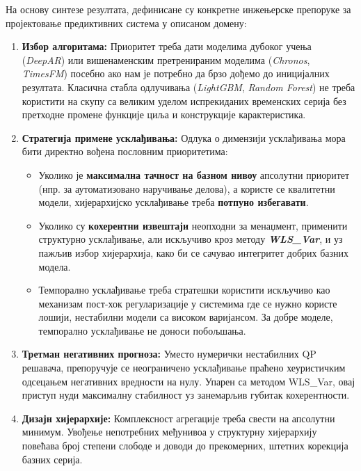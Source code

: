 \documentclass[12pt,oneside]{memoir}
\begin{document}
На основу синтезе резултата, дефинисане су конкретне инжењерске препоруке за пројектовање предиктивних система у описаном домену:

\begin{enumerate}
    \item \textbf{Избор алгоритама:} Приоритет треба дати моделима дубоког учења (\textit{DeepAR}) или вишенаменским претренираним моделима (\textit{Chronos}, \textit{TimesFM}) посебно ако нам је потребно да брзо дођемо до иницијалних резултата. Класична стабла одлучивања (\textit{LightGBM}, \textit{Random Forest}) не треба користити на скупу са великим уделом испрекиданих временских серија без претходне промене функције циља и конструкције карактеристика.
    
    \item \textbf{Стратегија примене усклађивања:} Одлука о димензији усклађивања мора бити директно вођена пословним приоритетима:
    \begin{itemize}
        \item Уколико је \textbf{максимална тачност на базном нивоу} апсолутни приоритет (нпр. за аутоматизовано наручивање делова), а користе се квалитетни модели, хијерархијско усклађивање треба \textbf{потпуно избегавати}.
        \item Уколико су \textbf{кохерентни извештаји} неопходни за менаџмент, применити структурно усклађивање, али искључиво кроз методу \textbf{\textit{WLS\_Var}}, и уз пажљив избор хијерархија, како би се сачувао интегритет добрих базних модела.
        \item Темпорално усклађивање треба стратешки користити искључиво као механизам пост-хок регуларизације у системима где се нужно користе лошији, нестабилни модели са високом варијансом. За добре моделе, темпорално усклађивање не доноси побољшања.
    \end{itemize}
    
    \item \textbf{Третман негативних прогноза:} Уместо нумерички нестабилних QP решавача, препоручује се неограничено усклађивање праћено хеуристичким одсецањем негативних вредности на нулу. Упарен са методом WLS\_Var, овај приступ нуди максималну стабилност уз занемарљив губитак кохерентности.
    
    \item \textbf{Дизајн хијерархије:} Комплексност агрегације треба свести на апсолутни минимум. Увођење непотребних међунивоа у структурну хијерархију повећава број степени слободе и доводи до прекомерних, штетних корекција базних серија.
\end{enumerate}
\end{document}
